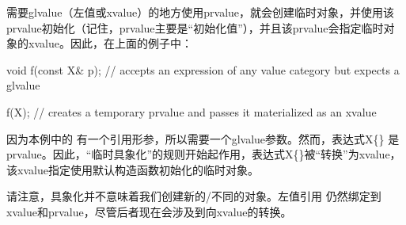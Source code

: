需要glvalue（左值或xvalue）的地方使用prvalue，就会创建临时对象，并使用该prvalue初始化（记住，prvalue主要是“初始化值”），并且该prvalue会指定临时对象的xvalue。因此，在上面的例子中：

\begin{cppcode}
void f(const X& p); // accepts an expression of any value category but expects a glvalue

f(X{}); // creates a temporary prvalue and passes it materialized as an xvalue
\end{cppcode}

因为本例中的  有一个引用形参，所以需要一个glvalue参数。然而，表达式X\{\} 是prvalue。因此，“临时具象化”的规则开始起作用，表达式X\{\}被“转换”为xvalue，该xvalue指定使用默认构造函数初始化的临时对象。

请注意，具象化并不意味着我们创建新的/不同的对象。左值引用  仍然绑定到xvalue和prvalue，尽管后者现在会涉及到向xvalue的转换。






